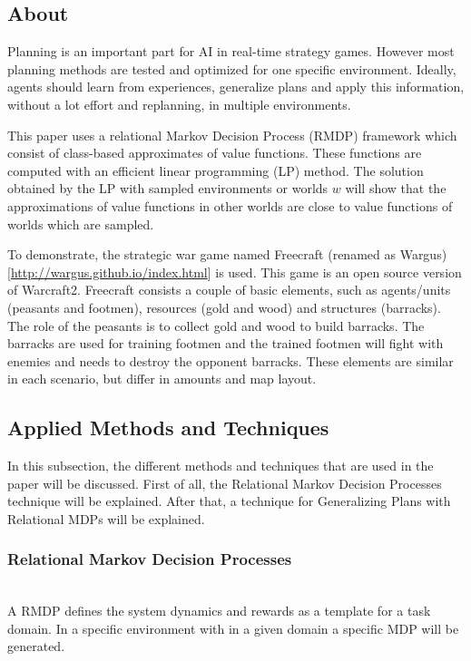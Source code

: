 \label{chapter:generalizing-planning}

\subsection{About}
Planning is an important part for AI in real-time strategy games. However most planning methods are tested and optimized for one specific environment. Ideally, agents should learn from experiences, generalize plans and apply this information, without a lot effort and replanning, in multiple environments.

This paper uses a relational Markov Decision Process (RMDP) framework which consist of class-based approximates of value functions. These functions are computed with an efficient linear programming (LP) method. The solution obtained by the LP with sampled environments or worlds $w$ will show that the approximations of value functions in other worlds are close to value functions of worlds which are sampled.

To demonstrate, the strategic war game named Freecraft (renamed as Wargus) [\url{http://wargus.github.io/index.html}] is used. This game is an open source version of Warcraft2. Freecraft consists a couple of basic elements, such as agents/units (peasants and footmen), resources (gold and wood) and structures (barracks). The role of the peasants is to collect gold and wood to build barracks. The barracks are used for training footmen and the trained footmen will fight with enemies and needs to destroy the opponent barracks.  
These elements are similar in each scenario, but differ in amounts and map layout.

\subsection{Applied Methods and Techniques}

In this subsection, the different methods and techniques that are used in the paper will be discussed. First of all, the Relational Markov Decision Processes technique will be explained. After that, a technique for Generalizing Plans with Relational MDPs will be explained.

\subsubsection{Relational Markov Decision Processes} \label{RMDP}~\\   

A RMDP defines the system dynamics and rewards as a template for a task domain. In a specific environment with in a given domain a specific MDP will be generated.

